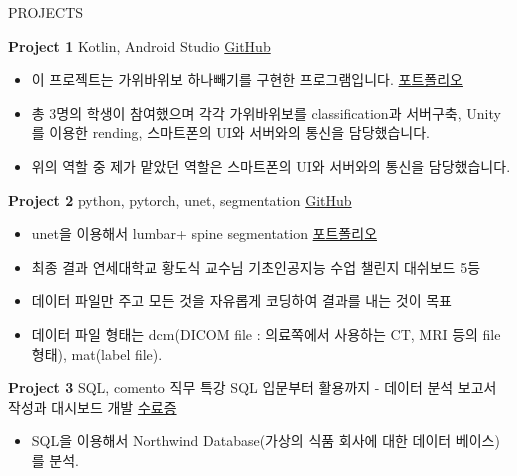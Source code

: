 \documentclass{resume} %
\begin{document}
\begin{rSection}{PROJECTS}
\vspace{-1.25em}
\item \textbf{Project 1} {Kotlin, Android Studio} \hfill \href{https://github.com/LeeGwanHui/Rock-Scissors-paper-kotlin}{GitHub}
\begin{itemize}
    \itemsep -3pt {} 
     \item 이 프로젝트는 가위바위보 하나빼기를 구현한 프로그램입니다. \hfill \href{https://docs.google.com/presentation/d/1ZdDWVgHbbFmNSEqbu_MjcjZ1Z4lViGbM/edit?usp=sharing&ouid=100946978702254343741&rtpof=true&sd=true}{포트폴리오}
     \item 총 3명의 학생이 참여했으며 각각 가위바위보를 classification과 서버구축, Unity를 이용한 rending, 스마트폰의 UI와 서버와의 통신을 담당했습니다.
    \item 위의 역할 중 제가 맡았던 역할은 스마트폰의 UI와 서버와의 통신을 담당했습니다.
 \end{itemize}
\item \textbf{Project 2} {python, pytorch, unet, segmentation} \hfill \href{https://github.com/LeeGwanHui/lumbar}{GitHub}
\begin{itemize}
    \itemsep -3pt {} 
     \item unet을 이용해서 lumbar+ spine segmentation \hfill \href{https://docs.google.com/presentation/d/1ZdDWVgHbbFmNSEqbu_MjcjZ1Z4lViGbM/edit?usp=sharing&ouid=100946978702254343741&rtpof=true&sd=true}{포트폴리오}
     \item 최종 결과 연세대학교 황도식 교수님 기초인공지능 수업 챌린지 대쉬보드 5등
    \item 데이터 파일만 주고 모든 것을 자유롭게 코딩하여 결과를 내는 것이 목표 
    \item 데이터 파일 형태는 dcm(DICOM file : 의료쪽에서 사용하는 CT, MRI 등의 file 형태), mat(label file).
 \end{itemize}
\item \textbf{Project 3} {SQL, comento 직무 특강 SQL 입문부터 활용까지 - 데이터 분석 보고서 작성과 대시보드 개발 } \hfill \href{https://drive.google.com/file/d/1PEf-mlerQgi70gw5mVsfADWKnZp_6UBb/view?usp=sharing}{수료증}
\begin{itemize}
    \itemsep -3pt {} 
     \item SQL을 이용해서 Northwind Database(가상의 식품 회사에 대한 데이터 베이스)를 분석.
 \end{itemize}
\end{rSection} 
\end{document}
